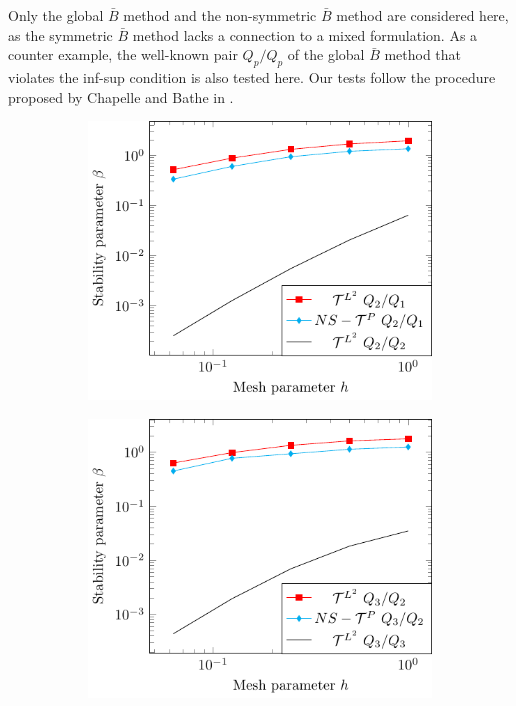 Only the global $\bar{B}$ method and the non-symmetric \Bezier $\bar{B}$ method are considered here, as the symmetric \Bezier $\bar{B}$ method lacks a connection to a mixed formulation. As a counter example, the well-known pair $Q_p/Q_p$ of the global $\bar{B}$ method that violates the inf-sup condition is also tested here. Our tests follow the procedure proposed by Chapelle and Bathe in \cite{chapelle_inf-sup_1993}.\par
\begin{figure}[htb!]
    \centering
    \begin{subfigure}[b]{0.31\linewidth}        %
        \centering
        \includegraphics[width=\linewidth]{beta_p_2}
    \end{subfigure}
    \begin{subfigure}[b]{0.31\linewidth}        %
        \centering
        \includegraphics[width=\linewidth]{beta_p_3}

\end{subfigure}
\end{figure}

